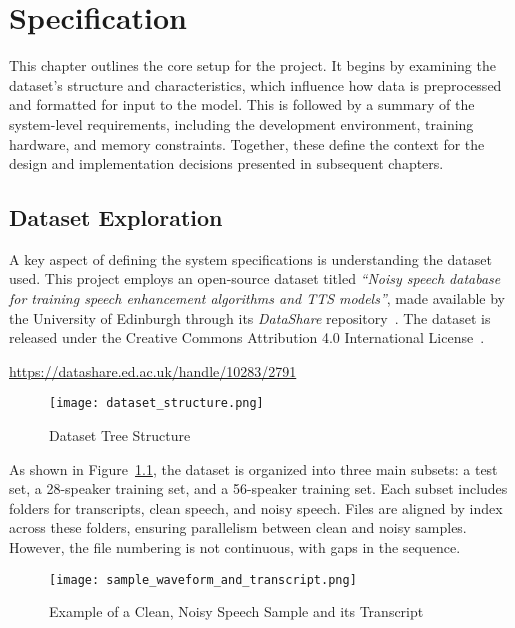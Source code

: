 \graphicspath{{content/chapters/4_specification/figures/}}
\chapter{Specification}
\label{chp:specification}

This chapter outlines the core setup for the project. It begins by examining the dataset’s structure and characteristics, which influence how data is preprocessed and formatted for input to the model. This is followed by a summary of the system-level requirements, including the development environment, training hardware, and memory constraints. Together, these define the context for the design and implementation decisions presented in subsequent chapters.

\section{Dataset Exploration}
\label{sec:dataset_exploration}

A key aspect of defining the system specifications is understanding the dataset used. This project employs an open-source dataset titled \textit{“Noisy speech database for training speech enhancement algorithms and TTS models”}, made available by the University of Edinburgh through its \textit{DataShare} repository~\cite{edinburghdataset}. The dataset is released under the Creative Commons Attribution 4.0 International License~\cite{ccby4}.

\url{https://datashare.ed.ac.uk/handle/10283/2791}

\begin{figure}[H]
    \centering
    \texttt{[image: dataset\_structure.png]}
    \caption{Dataset Tree Structure}
    \label{fig:dataset_structure}
\end{figure}

As shown in Figure~\ref{fig:dataset_structure}, the dataset is organized into three main subsets: a test set, a 28-speaker training set, and a 56-speaker training set. Each subset includes folders for transcripts, clean speech, and noisy speech. Files are aligned by index across these folders, ensuring parallelism between clean and noisy samples. However, the file numbering is not continuous, with gaps in the sequence.

\begin{figure}[H]
    \centering
    \texttt{[image: sample\_waveform\_and\_transcript.png]}
    \caption{Example of a Clean, Noisy Speech Sample and its Transcript}
    \label{fig:sample_waveform_and_transcript}
\end{figure}


